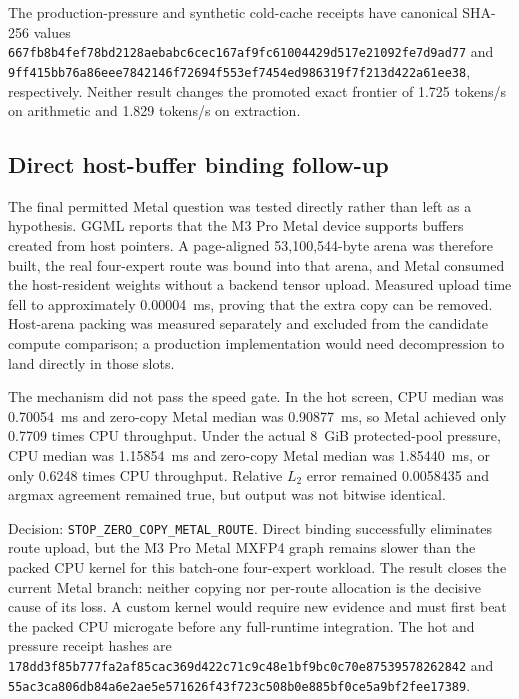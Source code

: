 The production-pressure and synthetic cold-cache receipts have canonical
SHA-256 values
\texttt{667fb8b4fef78bd2128aebabc6cec167af9fc61004429d517e21092fe7d9ad77}
and
\texttt{9ff415bb76a86eee7842146f72694f553ef7454ed986319f7f213d422a61ee38},
respectively.  Neither result changes the promoted exact frontier of 1.725
tokens/s on arithmetic and 1.829 tokens/s on extraction.

\subsection{Direct host-buffer binding follow-up}

The final permitted Metal question was tested directly rather than left as a
hypothesis.  GGML reports that the M3 Pro Metal device supports buffers created
from host pointers.  A page-aligned 53,100,544-byte arena was therefore built,
the real four-expert route was bound into that arena, and Metal consumed the
host-resident weights without a backend tensor upload.  Measured upload time
fell to approximately 0.00004~ms, proving that the extra copy can be removed.
Host-arena packing was measured separately and excluded from the candidate
compute comparison; a production implementation would need decompression to
land directly in those slots.

The mechanism did not pass the speed gate.  In the hot screen, CPU median was
0.70054~ms and zero-copy Metal median was 0.90877~ms, so Metal achieved only
0.7709 times CPU throughput.  Under the actual 8~GiB protected-pool pressure,
CPU median was 1.15854~ms and zero-copy Metal median was 1.85440~ms, or only
0.6248 times CPU throughput.  Relative $L_2$ error remained 0.0058435 and
argmax agreement remained true, but output was not bitwise identical.

Decision: \texttt{STOP\_ZERO\_COPY\_METAL_ROUTE}.  Direct binding successfully
eliminates route upload, but the M3 Pro Metal MXFP4 graph remains slower than
the packed CPU kernel for this batch-one four-expert workload.  The result
closes the current Metal branch: neither copying nor per-route allocation is
the decisive cause of its loss.  A custom kernel would require new evidence and
must first beat the packed CPU microgate before any full-runtime integration.
The hot and pressure receipt hashes are
\texttt{178dd3f85b777fa2af85cac369d422c71c9c48e1bf9bc0c70e87539578262842}
and
\texttt{55ac3ca806db84a6e2ae5e571626f43f723c508b0e885bf0ce5a9bf2fee17389}.
